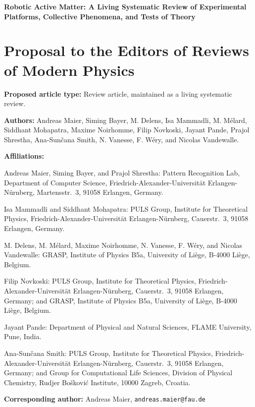 \begin{center}
{\Large\bfseries Robotic Active Matter: A Living Systematic Review
of Experimental Platforms, Collective Phenomena, and Tests of Theory}
\end{center}

\section*{Proposal to the Editors of Reviews of Modern Physics}

\noindent\textbf{Proposed article type:}
Review article, maintained as a living systematic review.

\noindent\textbf{Authors:}
Andreas Maier, Siming Bayer, M. Delens, Isa Mammadli,
M. M\'elard, Siddhant Mohapatra, Maxime Noirhomme,
Filip Novkoski, Jayant Pande, Prajol Shrestha,
Ana-Sun\v{c}ana Smith, N. Vanesse, F. W\'ery,
and Nicolas Vandewalle.

\noindent\textbf{Affiliations:}

\noindent Andreas Maier, Siming Bayer, and Prajol Shrestha:
Pattern Recognition Lab, Department of Computer Science,
Friedrich-Alexander-Universit\"at Erlangen-N\"urnberg,
Martensstr.\ 3, 91058 Erlangen, Germany.

\noindent Isa Mammadli and Siddhant Mohapatra:
PULS Group, Institute for Theoretical Physics,
Friedrich-Alexander-Universit\"at Erlangen-N\"urnberg,
Cauerstr.\ 3, 91058 Erlangen, Germany.

\noindent M. Delens, M. M\'elard, Maxime Noirhomme,
N. Vanesse, F. W\'ery, and Nicolas Vandewalle:
GRASP, Institute of Physics B5a,
University of Li\`ege, B-4000 Li\`ege, Belgium.

\noindent Filip Novkoski:
PULS Group, Institute for Theoretical Physics,
Friedrich-Alexander-Universit\"at Erlangen-N\"urnberg,
Cauerstr.\ 3, 91058 Erlangen, Germany;
and GRASP, Institute of Physics B5a,
University of Li\`ege, B-4000 Li\`ege, Belgium.

\noindent Jayant Pande:
Department of Physical and Natural Sciences,
FLAME University, Pune, India.

\noindent Ana-Sun\v{c}ana Smith:
PULS Group, Institute for Theoretical Physics,
Friedrich-Alexander-Universit\"at Erlangen-N\"urnberg,
Cauerstr.\ 3, 91058 Erlangen, Germany;
and Group for Computational Life Sciences,
Division of Physical Chemistry,
Rudjer Bo\v{s}kovi\'c Institute,
10000 Zagreb, Croatia.

\noindent\textbf{Corresponding author:} Andreas Maier, \texttt{andreas.maier@fau.de}

